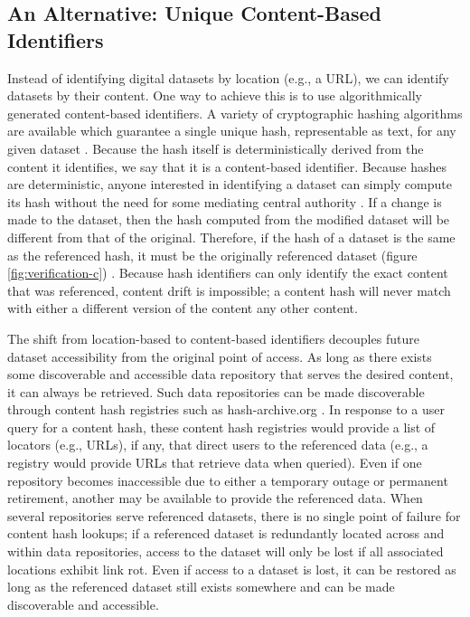 \subsection*{An Alternative: Unique Content-Based Identifiers}
Instead of identifying digital datasets by location (e.g., a URL), we can identify datasets by their content. One way to achieve this is to use algorithmically generated content-based identifiers. A variety of cryptographic hashing algorithms are available which guarantee a single unique hash, representable as text, for any given dataset . Because the hash itself is deterministically derived from the content it identifies, we say that it is a content-based identifier. Because hashes are deterministic, anyone interested in identifying a dataset can simply compute its hash without the need for some mediating central authority \citep{Paskin_1999}. If a change is made to the dataset, then the hash computed from the modified dataset will be different from that of the original. Therefore, if the hash of a dataset is the same as the referenced hash, it must be the originally referenced dataset (figure \ref{fig:verification-c}) . Because hash identifiers can only identify the exact content that was referenced, content drift is impossible; a content hash will never match with either a different version of the content any other content.


The shift from location-based to content-based identifiers decouples future dataset accessibility from the original point of access. As long as there exists some discoverable and accessible data repository that serves the desired content, it can always be retrieved. Such data repositories can be made discoverable through content hash registries such as hash-archive.org \citep{Trask_2015}. In response to a user query for a content hash, these content hash registries would provide a list of locators (e.g., URLs), if any, that direct users to the referenced data (e.g., a registry would provide URLs that retrieve data when queried). Even if one repository becomes inaccessible due to either a temporary outage or permanent retirement, another may be available to provide the referenced data. When several repositories serve referenced datasets, there is no single point of failure for content hash lookups; if a referenced dataset is redundantly located across and within data repositories, access to the dataset will only be lost if all associated locations exhibit link rot. Even if access to a dataset is lost, it can be restored as long as the referenced dataset still exists somewhere and can be made discoverable and accessible.

